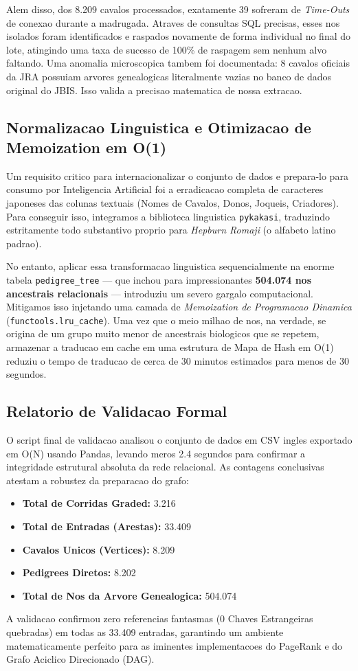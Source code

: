 \documentclass[12pt,a4paper]{article}
\begin{document}
Alem disso, dos 8.209 cavalos processados, exatamente 39 sofreram de \textit{Time-Outs} de conexao durante a madrugada. Atraves de consultas SQL precisas, esses nos isolados foram identificados e raspados novamente de forma individual no final do lote, atingindo uma taxa de sucesso de 100\% de raspagem sem nenhum alvo faltando. Uma anomalia microscopica tambem foi documentada: 8 cavalos oficiais da JRA possuiam arvores genealogicas literalmente vazias no banco de dados original do JBIS. Isso valida a precisao matematica de nossa extracao.

\subsection{Normalizacao Linguistica e Otimizacao de Memoization em O(1)}
Um requisito critico para internacionalizar o conjunto de dados e prepara-lo para consumo por Inteligencia Artificial foi a erradicacao completa de caracteres japoneses das colunas textuais (Nomes de Cavalos, Donos, Joqueis, Criadores). Para conseguir isso, integramos a biblioteca linguistica \texttt{pykakasi}, traduzindo estritamente todo substantivo proprio para \textit{Hepburn Romaji} (o alfabeto latino padrao).

No entanto, aplicar essa transformacao linguistica sequencialmente na enorme tabela \texttt{pedigree\_tree} — que inchou para impressionantes \textbf{504.074 nos ancestrais relacionais} — introduziu um severo gargalo computacional. Mitigamos isso injetando uma camada de \textit{Memoization de Programacao Dinamica} (\texttt{functools.lru\_cache}). Uma vez que o meio milhao de nos, na verdade, se origina de um grupo muito menor de ancestrais biologicos que se repetem, armazenar a traducao em cache em uma estrutura de Mapa de Hash em O(1) reduziu o tempo de traducao de cerca de 30 minutos estimados para menos de 30 segundos.

\subsection{Relatorio de Validacao Formal}
O script final de validacao analisou o conjunto de dados em CSV ingles exportado em O(N) usando Pandas, levando meros 2.4 segundos para confirmar a integridade estrutural absoluta da rede relacional. As contagens conclusivas atestam a robustez da preparacao do grafo:
\begin{itemize}
    \item \textbf{Total de Corridas Graded:} 3.216
    \item \textbf{Total de Entradas (Arestas):} 33.409
    \item \textbf{Cavalos Unicos (Vertices):} 8.209
    \item \textbf{Pedigrees Diretos:} 8.202
    \item \textbf{Total de Nos da Arvore Genealogica:} 504.074
\end{itemize}
A validacao confirmou zero referencias fantasmas (0 Chaves Estrangeiras quebradas) em todas as 33.409 entradas, garantindo um ambiente matematicamente perfeito para as iminentes implementacoes do PageRank e do Grafo Aciclico Direcionado (DAG).
\end{document}

